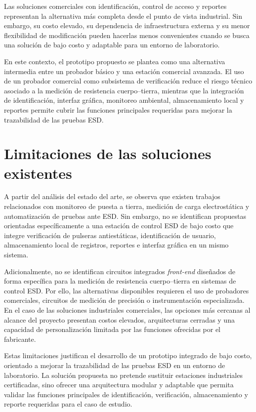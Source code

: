 Las soluciones comerciales con identificación, control de acceso y reportes representan la
alternativa más completa desde el punto de vista industrial. Sin embargo, su costo elevado,
su dependencia de infraestructura externa y su menor flexibilidad de modificación pueden
hacerlas menos convenientes cuando se busca una solución de bajo costo y adaptable para
un entorno de laboratorio.

En este contexto, el prototipo propuesto se plantea como una alternativa intermedia entre
un probador básico y una estación comercial avanzada. El uso de un probador comercial
como subsistema de verificación reduce el riesgo técnico asociado a la medición de
resistencia cuerpo--tierra, mientras que la integración de identificación, interfaz gráfica,
monitoreo ambiental, almacenamiento local y reportes permite cubrir las funciones
principales requeridas para mejorar la trazabilidad de las pruebas ESD.

\section{Limitaciones de las soluciones existentes}

A partir del análisis del estado del arte, se observa que existen trabajos relacionados con
monitoreo de puesta a tierra, medición de carga electrostática y automatización de pruebas
ante ESD. Sin embargo, no se identifican propuestas orientadas específicamente a una
estación de control ESD de bajo costo que integre verificación de pulseras antiestáticas,
identificación de usuario, almacenamiento local de registros, reportes e interfaz gráfica
en un mismo sistema.

Adicionalmente, no se identifican circuitos integrados \textit{front-end} diseñados de forma
específica para la medición de resistencia cuerpo--tierra en sistemas de control ESD. Por
ello, las alternativas disponibles requieren el uso de probadores comerciales, circuitos de
medición de precisión o instrumentación especializada. En el caso de las soluciones
industriales comerciales, las opciones más cercanas al alcance del proyecto presentan
costos elevados, arquitecturas cerradas y una capacidad de personalización limitada por
las funciones ofrecidas por el fabricante.

Estas limitaciones justifican el desarrollo de un prototipo integrado de bajo costo,
orientado a mejorar la trazabilidad de las pruebas ESD en un entorno de laboratorio. La
solución propuesta no pretende sustituir estaciones industriales certificadas, sino ofrecer
una arquitectura modular y adaptable que permita validar las funciones principales de
identificación, verificación, almacenamiento y reporte requeridas para el caso de estudio.
